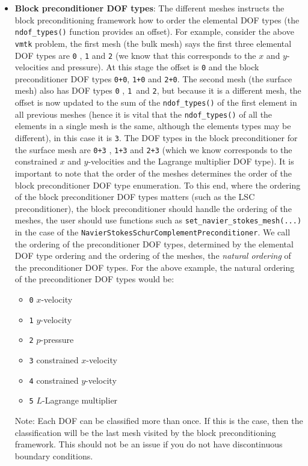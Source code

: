 \begin{itemize}
\item \textbf{Block preconditioner DOF types}: The different meshes instructs the block preconditioning framework how to order the elemental DOF types (the \verb+ndof_types()+ function provides an offset). For example, consider the above \verb+vmtk+ problem, the first mesh (the bulk mesh) says the first three elemental DOF types are \verb+0+ , \verb+1+ and \verb+2+ (we know that this corresponds to the $x$ and $y$-velocities and pressure). At this stage the offset is \verb+0+ and the block preconditioner DOF types \verb-0+0-, \verb-1+0- and \verb-2+0-. The second mesh (the surface mesh) also has DOF types \verb+0+ , \verb+1 +and \verb+2+, but because it is a different mesh, the offset is now updated to the sum of the \verb+ndof_types()+ of the first element in all previous meshes (hence it is vital that the \verb+ndof_types()+ of all the elements in a single mesh is the same, although the elements types may be different), in this case it is \verb+3+. The DOF types in the block preconditioner for the surface mesh are \verb-0+3- , \verb-1+3- and \verb-2+3- (which we know corresponds to the constrained $x$ and $y$-velocities and the Lagrange multiplier DOF type). It is important to note that the order of the meshes determines the order of the block preconditioner DOF type enumeration. To this end, where the ordering of the block preconditioner DOF types matters (such as the LSC preconditioner), the block preconditioner should handle the ordering of the meshes, the user should use functions such as \verb+set_navier_stokes_mesh(...)+ in the case of the \verb+NavierStokesSchurComplementPreconditioner+. We call the ordering of the preconditioner DOF types, determined by the elemental DOF type ordering and the ordering of the meshes, the \emph{natural ordering} of the preconditioner DOF types. For the above example, the natural ordering of the preconditioner DOF types would be:
\begin{itemize}
 \item \verb+0+ $x$-velocity
 \item \verb+1+ $y$-velocity
 \item \verb+2+ $p$-pressure
 \item \verb+3+ constrained $x$-velocity
 \item \verb+4+ constrained $y$-velocity
 \item \verb+5+ $L$-Lagrange multiplier
\end{itemize}

Note: Each DOF can be classified more than once. If this is the case, then the classification will be the last mesh visited by the block preconditioning framework. This should not be an issue if you do not have discontinuous boundary conditions.


\end{itemize}

